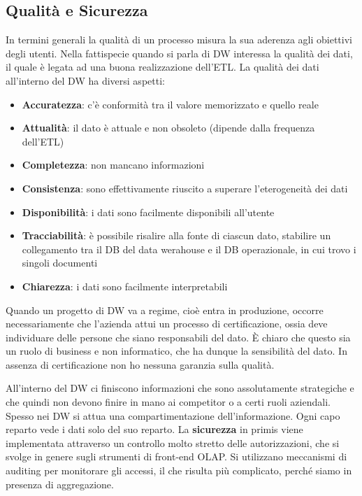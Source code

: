 \subsection{Qualità e Sicurezza}
In termini generali la qualità di un processo misura la sua aderenza agli obiettivi degli utenti. Nella fattispecie quando si parla di DW interessa la qualità dei dati, il quale è legata ad una buona realizzazione dell’ETL. La qualità dei dati all’interno del DW ha diversi aspetti:
\begin{itemize}
	\item 
	\textbf{Accuratezza}: c’è conformità tra il valore memorizzato e quello reale
	\item 
	\textbf{Attualità}: il dato è attuale e non obsoleto (dipende dalla frequenza dell’ETL)
	\item 
	\textbf{Completezza}: non mancano informazioni
	\item 
	\textbf{Consistenza}: sono effettivamente riuscito a superare l’eterogeneità dei dati
	\item 
	\textbf{Disponibilità}: i dati sono facilmente disponibili all’utente
	\item
	\textbf{Tracciabilità}: è possibile risalire alla fonte di ciascun dato, stabilire un collegamento tra il DB del data werahouse e il DB operazionale, in cui trovo i singoli documenti
	\item 
	\textbf{Chiarezza}: i dati sono facilmente interpretabili
\end{itemize}
Quando un progetto di DW va a regime, cioè entra in produzione,  occorre necessariamente che l’azienda attui un processo di certificazione, ossia deve individuare delle persone che siano responsabili del dato. È chiaro che questo sia un ruolo di business e non informatico, che ha dunque la sensibilità del dato. In assenza di certificazione non ho nessuna garanzia sulla qualità. 

All’interno del DW ci finiscono informazioni che sono assolutamente strategiche e che quindi non devono finire in mano ai competitor o a certi ruoli aziendali. Spesso nei DW si attua una compartimentazione dell’informazione. Ogni capo reparto vede i dati solo del suo reparto. La \textbf{sicurezza} in primis viene implementata attraverso un controllo molto stretto delle autorizzazioni, che si svolge in genere sugli strumenti di front-end OLAP. Si utilizzano meccanismi di auditing per monitorare gli accessi, il che risulta più complicato, perché siamo in presenza di aggregazione. 